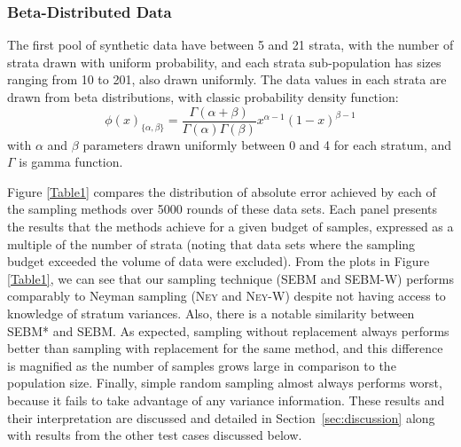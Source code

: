 \subsubsection{Beta-Distributed Data}
The first pool of synthetic data %
have between 5 and 21 strata, with the number of strata drawn with uniform probability, 
and each strata sub-population has sizes ranging from 10 to 201, also drawn uniformly.
The data values in each strata are drawn from beta distributions, with classic probability density function:
$$\phi(x)_{\{\alpha,\beta\}}
=\frac{\Gamma(\alpha+\beta)}{\Gamma(\alpha)\Gamma(\beta)}     
    x^{\alpha-1}(1-x)^{\beta-1} $$
with $\alpha$ and $\beta$ parameters drawn uniformly between 0 and 4 for each stratum, and $\Gamma$ is gamma function.










Figure \ref{Table1} compares the distribution of absolute error achieved by each of the sampling methods over 5000 rounds of these data sets.
Each panel presents the results that the methods achieve for a given budget of samples, 
expressed as a multiple of the number of strata (noting that data sets where the sampling budget exceeded the volume of data were excluded).
From the plots in Figure \ref{Table1}, we can see that our sampling technique (SEBM and SEBM-W) performs comparably to
Neyman sampling (\textsc{Ney} and \textsc{Ney-W}) despite not having access to knowledge of stratum variances.
Also, there is a notable similarity between SEBM* and SEBM.
As expected, sampling without replacement always performs better than sampling with replacement for the same method, and this difference is magnified as the number of samples grows large in comparison to the population size. 
Finally, simple random sampling almost always performs worst, because it fails to take advantage of any variance information.
These results and their interpretation are discussed and detailed in Section~\ref{sec:discussion} along with results from the other test cases discussed below.




